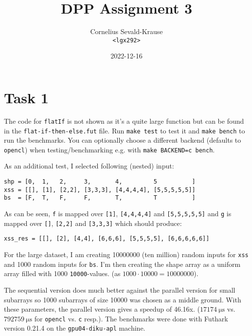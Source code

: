 \documentclass{article}
\begin{document}
\title{DPP Assignment 3}
\author{Cornelius Sevald-Krause \\ \texttt{<lgx292>}}
\date{2022-12-16}
\maketitle

\section*{Task 1}

The code for \verb|flatIf| is not shown as it's a quite large function but can
be found in the \verb|flat-if-then-else.fut| file. Run \verb|make test| to test
it and \verb|make bench| to run the benchmarks. You can optionally choose a
different backend (defaults to \verb|opencl|) when testing/benchmarking e.g.
with \verb|make BACKEND=c bench|.

As an additional test, I selected following (nested) input:
\begin{Verbatim}
shp = [0,  1,   2,     3,       4,         5          ]
xss = [[], [1], [2,2], [3,3,3], [4,4,4,4], [5,5,5,5,5]]
bs  = [F,  T,   F,     F,       T,         T          ]
\end{Verbatim}
As can be seen, \verb|f| is mapped over \verb|[1]|, \verb|[4,4,4,4]| and
\verb|[5,5,5,5,5]| and \verb|g| is mapped over \verb|[]|, \verb|[2,2]| and
\verb|[3,3,3]| which should produce:
\begin{Verbatim}
xss_res = [[], [2], [4,4], [6,6,6], [5,5,5,5], [6,6,6,6,6]]
\end{Verbatim}

For the large dataset, I am creating \num{10000000} (ten million) random inputs for
\verb|xss| and \num{1000} random inputs for \verb|bs|. I'm then creating the
shape array as a uniform array filled with \num{1000} \verb|10000|-values.
(as $\num{1000} \cdot \num{10000} = \num{10000000}$).

The sequential version does much better against the parallel version for small
subarrays so \num{1000} subarrays of size \num{10000} was chosen as a middle
ground. With these parameters, the parallel version gives a speedup of
\textapprox 46.16x. ($\qty{17174}{\micro\second}$ vs.
$\qty{792759}{\micro\second}$ for \verb|opencl| vs. \verb|c| resp.). The
benchmarks were done with Futhark version 0.21.4 on the \verb|gpu04-diku-apl|
machine.
\end{document}
